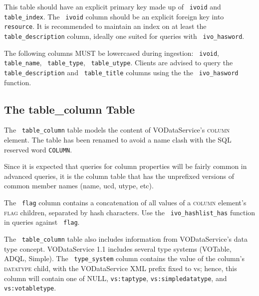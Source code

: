 \documentclass[11pt,a4paper]{ivoa}
\newcommand{\rtent}[1]{\texttt{\color{rtcolor} #1}}
\newcommand{\vorent}[1]{\textsc{#1}}
\begin{document}

 

This table should have an explicit primary key made up of
\rtent{ivoid} and \rtent{table\_index}.  The 
\rtent{ivoid} column should be an explicit
foreign key into \rtent{resource}.  It is recommended to
maintain an index on at least the \rtent{table\_description}
column, ideally one suited for queries with \rtent{ivo\_hasword}.

The following columns MUST be lowercased during ingestion:
\rtent{ivoid}, \rtent{table\_name}, \rtent{table\_type},
\rtent{table\_utype}.
Clients are advised to query the \rtent{table\_description}
and \rtent{table\_title}  columns
using the the \rtent{ivo\_hasword} function.




\subsection{The table\_column Table}

\label{table_table_column}

The \rtent{table\_column}  table models the content of VODataService's
\vorent{column} element.  The table has been renamed to avoid
a name clash with the SQL reserved word \texttt{COLUMN}.

Since it is expected that queries for column properties will be
fairly common in advanced queries, it is the column table that has the
unprefixed versions of common member names (name,  ucd,
utype, etc).

The \rtent{flag} column contains a concatenation of all values
of a \vorent{column} element's \vorent{flag} children, separated
by hash characters.  Use the \rtent{ivo\_hashlist\_has} function in
queries against \rtent{flag}.

The \rtent{table\_column} table also includes information from
VODataService's data type concept.  VODataService 1.1 includes several type
systems (VOTable, ADQL, Simple).  The
\rtent{type\_system} column contains the value of the column's 
\vorent{datatype} child, with the VODataService XML prefix fixed
to vs; hence, this column will contain one of NULL,
\texttt{vs:taptype},
\texttt{vs:simpledatatype}, and \texttt{vs:votabletype}.


\end{document}
